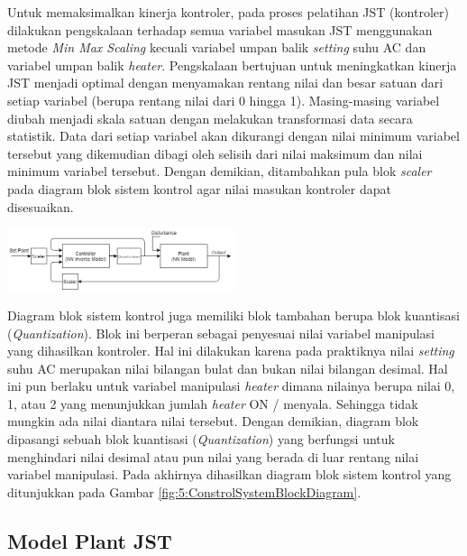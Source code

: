 \documentclass[a4paper,10pt]{article}
\makeatletter
\newenvironment{body}{\begin{multicols}{2}}{\end{multicols}}
\renewenvironment{figure}
{\def\@captype{figure}%
	\captionsetup{labelsep=period,format=hang,font=footnotesize,justification=justified}
}
{}
\makeatother
\begin{document}
\begin{body}
		Untuk memaksimalkan kinerja kontroler, pada proses pelatihan JST (kontroler) dilakukan pengskalaan terhadap semua variabel masukan JST menggunakan metode \textit{Min Max Scaling} kecuali variabel umpan balik \textit{setting} suhu AC dan variabel umpan balik \textit{heater}. Pengskalaan bertujuan untuk meningkatkan kinerja JST menjadi optimal dengan menyamakan rentang nilai dan besar satuan dari setiap variabel (berupa rentang nilai dari 0 hingga 1). Masing-masing variabel diubah menjadi skala satuan dengan melakukan transformasi data secara statistik. Data dari setiap variabel akan dikurangi dengan nilai minimum variabel tersebut yang dikemudian dibagi oleh selisih dari nilai maksimum dan nilai minimum variabel tersebut. Dengan demikian, ditambahkan pula blok \textit{scaler} pada diagram blok sistem kontrol agar nilai masukan kontroler dapat disesuaikan.
		
		\begin{figure}
			\centering
			\includegraphics[width=0.5\textwidth]{figures/ControlDesignDiagramII}
			\caption{Diagram blok sistem kontrol berbasis JST}
			\label{fig:5:ConstrolSystemBlockDiagram}
		\end{figure}
		
		Diagram blok sistem kontrol juga memiliki blok tambahan berupa blok kuantisasi (\textit{Quantization}). Blok ini berperan sebagai penyesuai nilai variabel manipulasi yang dihasilkan kontroler. Hal ini dilakukan karena pada praktiknya nilai \textit{setting} suhu AC merupakan nilai bilangan bulat dan bukan nilai bilangan desimal. Hal ini pun berlaku untuk variabel manipulasi \textit{heater} dimana nilainya berupa nilai 0, 1, atau 2 yang menunjukkan jumlah \textit{heater} ON / menyala. Sehingga tidak mungkin ada nilai diantara nilai tersebut. Dengan demikian, diagram blok dipasangi sebuah blok kuantisasi (\textit{Quantization}) yang berfungsi untuk menghindari nilai desimal atau pun nilai yang berada di luar rentang nilai variabel manipulasi. Pada akhirnya dihasilkan diagram blok sistem kontrol yang ditunjukkan pada Gambar \ref{fig:5:ConstrolSystemBlockDiagram}.\\
		
		\subsection{Model Plant JST}
		

\end{body}
\end{document}
